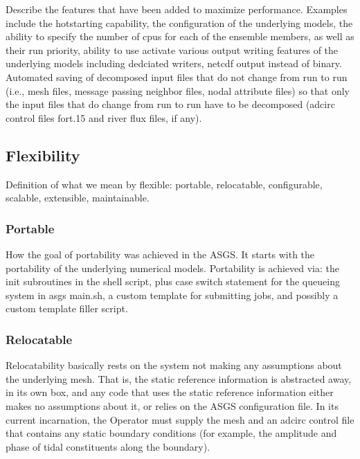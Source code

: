 \documentclass[12pt]{article}
\begin{document}
Describe the features that have been added to maximize performance. 
Examples include the hotstarting capability, the configuration of 
the underlying models, the ability to specify the number of cpus for 
each of the ensemble members, as well as their run priority, ability 
to use activate various output writing features of the underlying 
models including dedciated writers, netcdf output instead of binary. 
Automated saving of decomposed input files that do not change from 
run to run (i.e., mesh files, message passing neighbor files, nodal 
attribute files) so that only the input files that do change from 
run to run have to be decomposed (adcirc control files fort.15 and 
river flux files, if any). 

\subsection{Flexibility}

Definition of what we mean by flexible: portable, relocatable, 
configurable, scalable, extensible, maintainable.

\subsubsection{Portable}

How the goal of portability was achieved in the ASGS. It starts with 
the portability of the underlying numerical models. Portability is achieved
via: the init subroutines in the shell script, plus case switch statement for
the queueing system in asgs main.sh, a custom template for submitting 
jobs, and possibly a custom template filler script. 

\subsubsection{Relocatable}

Relocatability basically rests on the system not making any 
assumptions about the underlying mesh. That is, the static reference 
information is abstracted away, in its own box, and any code that 
uses the static reference information either makes no assumptions 
about it, or relies on the ASGS configuration file. In its current 
incarnation, the Operator must supply the mesh and an adcirc control 
file that contains any static boundary conditions (for example, the 
amplitude and phase of tidal constituents along the boundary). 
\end{document}
